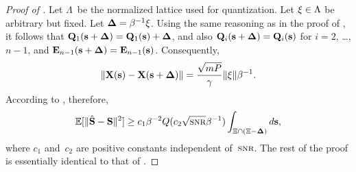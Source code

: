 \begin{subappendices}
  \begin{proof}[Proof of ]
    Let $\Lambda$~be the normalized lattice used for quantization. Let $\mathbf{\xi} \in
    \Lambda$ be arbitrary but fixed. Let $\mathbf{\Delta} = \beta^{-1} \mathbf{\xi}$. Using the same
    reasoning as in the proof of , it follows that $\mathbf{Q}_1(\mathbf{s}
    + \mathbf{\Delta}) = \mathbf{Q}_1(\mathbf{s}) + \mathbf{\Delta}$, and also $\mathbf{Q}_i(\mathbf{s} + \mathbf{\Delta}) = \mathbf{Q}_i(\mathbf{s})$ for $i = 2$,
    \ldots, $n-1$, and $\mathbf{E}_{n-1}(\mathbf{s}+\mathbf{\Delta}) = \mathbf{E}_{n-1}(\mathbf{s})$. Consequently,
    \begin{equation*}
      \| \mathbf{X}(\mathbf{s}) - \mathbf{X}(\mathbf{s} +\mathbf{\Delta}) \| = \frac{\sqrt{mP}}{\gamma}\|\mathbf{\xi}\| \beta^{-1}.
    \end{equation*}
    According to , therefore,
    \begin{equation*}
      \msev \ge c_1 \beta^{-2} Q(c_2 \sqrt{\snr} \beta^{-1}) \int_{\Xi \cap (\Xi
      - \Dv)} d\s,
    \end{equation*}
    where $c_1$ and~$c_2$ are positive constants independent of~$\snr$.  The
    rest of the proof is essentially identical to that of
    . 
  \end{proof}

\end{subappendices}
